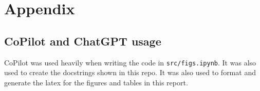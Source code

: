 \documentclass[11pt]{article}
\begin{document}
\section{Appendix}
\subsection{CoPilot and ChatGPT usage}
CoPilot was used heavily when writing the code in \texttt{src/figs.ipynb}. It was 
also used to create the docstrings shown in this repo. It was also used to format and generate the latex for the figures and tables in this report.
\end{document}
